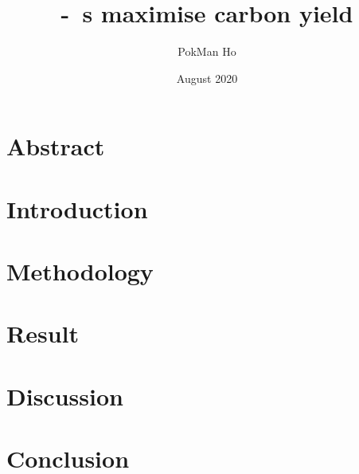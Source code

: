 \documentclass[a4paper,11pt]{article}
\title{\Phy-\bac\ \pbs s maximise carbon yield}
\author{PokMan Ho}
\date{August 2020}
\begin{document}
\maketitle



\section{Abstract}


\section{Introduction}


\section{Methodology}


\section{Result}



\section{Discussion}



\section{Conclusion}




\nocite{*}\printbibliography
\clearpage

\end{document}
